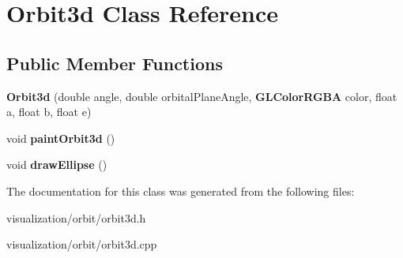 \section{\-Orbit3d \-Class \-Reference}
\label{d8/d23/classOrbit3d}
\subsection*{\-Public \-Member \-Functions}
\begin{DoxyCompactItemize}
\item 
{\bfseries \-Orbit3d} (double angle, double orbital\-Plane\-Angle, {\bf \-G\-L\-Color\-R\-G\-B\-A} color, float a, float b, float e)\label{d8/d23/classOrbit3d_af755e094b26297e18213c6039d370170}

\item 
void {\bfseries paint\-Orbit3d} ()\label{d8/d23/classOrbit3d_afcf596df8804d489732346c8339bbac0}

\item 
void {\bfseries draw\-Ellipse} ()\label{d8/d23/classOrbit3d_ab183f3086b45b75f594e457e0b9563f2}

\end{DoxyCompactItemize}


\-The documentation for this class was generated from the following files\-:\begin{DoxyCompactItemize}
\item 
visualization/orbit/orbit3d.\-h\item 
visualization/orbit/orbit3d.\-cpp\end{DoxyCompactItemize}
